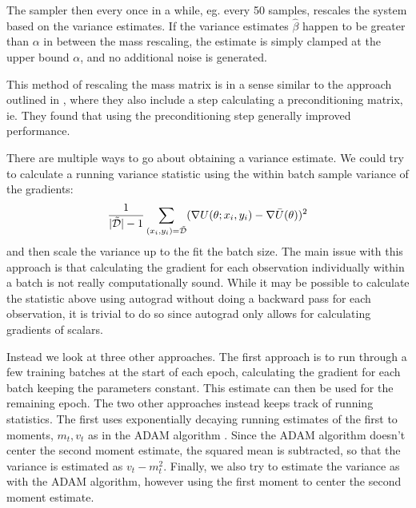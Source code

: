 The sampler then every once in a while, eg. every 50 samples, rescales the system based on the variance estimates.
If the variance estimates $\hat \beta$ happen to be greater than $\alpha$ in between the mass rescaling, the estimate is simply clamped at the upper bound $\alpha$, and no additional noise is generated.  

This method of rescaling the mass matrix is in a sense similar to the approach outlined in \cite{wenzel_how_2020}, where they also include a step calculating a preconditioning matrix, ie.
They found that using the preconditioning step generally improved performance.

There are multiple ways to go about obtaining a variance estimate.
We could try to calculate a running variance statistic using the within batch sample variance of the gradients:
\begin{equation}
    \frac{1}{|\tilde{\mathcal{D}}|-1}\sum_{(x_i,y_i)=\tilde{\mathcal{D}}} (\nabla U(\theta; x_i, y_i) - \nabla \bar{U}(\theta))^2
\end{equation}
and then scale the variance up to the fit the batch size. 
The main issue with this approach is that calculating the gradient for each observation individually within a batch is not really computationally sound.
While it may be possible to calculate the statistic above using autograd without doing a backward pass for each observation, it is trivial to do so since autograd only allows for calculating gradients of scalars. 

Instead we look at three other approaches. 
The first approach is to run through a few training batches at the start of each epoch, calculating the gradient for each batch keeping the parameters constant. 
This estimate can then be used for the remaining epoch. 
The two other approaches instead keeps track of running statistics. 
The first uses exponentially decaying running estimates of the first to moments, $m_t, v_t$ as in the ADAM algorithm \cite{kingma_adam_2017}.
Since the ADAM algorithm doesn't center the second moment estimate, the squared mean is subtracted, so that the variance is estimated as $v_t - m_t^2$.
Finally, we also try to estimate the variance as with the ADAM algorithm, however using the first moment to center the second moment estimate. 

